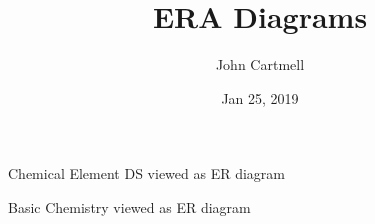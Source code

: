 \documentclass[xcolor=pst,dvips]{beamer}   %
\title[John Cartmell]{ERA Diagrams}
\author{John Cartmell}
\institute{Otium}
\date{Jan 25, 2019}
\renewcommand{\erpictureFolder}[0]{../../SharedPictures}
\begin{document}
\section{\MToDsection}
\subsection{\MToDsubsectionERA}

\newcommand{\attr}[1]{#1}
\renewcommand{\attr}[1]{\psframebox[linecolor=red,framearc=.1]{#1}}
\newcommand{\attrtype}[1]{#1}
\renewcommand{\attrtype}[1]{\psframebox[linecolor=blue,framearc=.1]{#1}}
\newcommand{\etype}[1]{#1}
\renewcommand{\etype}[1]{\psframebox[linecolor=red,framearc=.1]{#1}}

\newcommand{\CEsymboltype}[0]{varchar(2)}
\newcommand{\CEatomicnumbertype}{number(1,1000)}
\newcommand{\CEfloattype}{float}
\newcommand{\CEnametype}{varchar(64)}
\newcommand{\CEvalencynumbertype}{number(-7,7)}

\begin{frame}
\titlepage
\end{frame}


\begin{frame}{Chemical Element DS viewed as ER diagram}
\begin{center}
\scalebox{0.85}{

}
\end{center}

\end{frame}

\begin{frame}{Basic Chemistry viewed as ER diagram}
\begin{center}
\scalebox{0.5}{

}
\end{center}
\end{frame}
\end{document}
